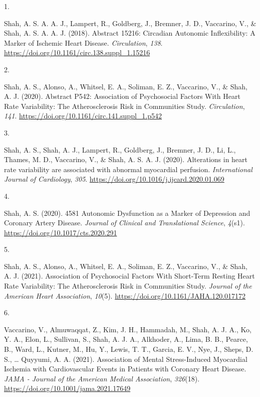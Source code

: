 \documentclass[10pt,a4paper,]{article}
\newlength{\cslhangindent}
\newlength{\csllabelwidth}
\newenvironment{CSLReferences}[2] %
 {\begin{list}{}{%
  \setlength{\itemindent}{0pt}
  \setlength{\leftmargin}{0pt}
  \setlength{\parsep}{0pt}
  \ifodd #1
   \setlength{\leftmargin}{\cslhangindent}
   \setlength{\itemindent}{-1\cslhangindent}
  \fi
  \setlength{\itemsep}{#2\baselineskip}}}
 {\end{list}}
\newcommand{\CSLLeftMargin}[1]{\parbox[t]{\csllabelwidth}{\strut#1\strut}}
\newcommand{\CSLRightInline}[1]{\parbox[t]{\linewidth - \csllabelwidth}{\strut#1\strut}}
\begin{document}
\hypertarget{refs-c6c7117c9609415cd3b5d6003cd86a32}{}
\begin{CSLReferences}{0}{0}
\leavevmode{}%
\CSLLeftMargin{1. }%
\CSLRightInline{Shah, A. S. A. A. J., Lampert, R., Goldberg, J.,
Bremner, J. D., Vaccarino, V., \& Shah, A. S. A. A. J. (2018). Abstract
15216: Circadian Autonomic Inflexibility: A Marker of Ischemic Heart
Disease. \emph{Circulation}, \emph{138}.
\url{https://doi.org/10.1161/circ.138.suppl_1.15216}}

\leavevmode{}%
\CSLLeftMargin{2. }%
\CSLRightInline{Shah, A. S., Alonso, A., Whitsel, E. A., Soliman, E. Z.,
Vaccarino, V., \& Shah, A. J. (2020). Abstract P542: Association of
Psychosocial Factors With Heart Rate Variability: The Atherosclerosis
Risk in Communities Study. \emph{Circulation}, \emph{141}.
\url{https://doi.org/10.1161/circ.141.suppl_1.p542}}

\leavevmode{}%
\CSLLeftMargin{3. }%
\CSLRightInline{Shah, A. S., Shah, A. J., Lampert, R., Goldberg, J.,
Bremner, J. D., Li, L., Thames, M. D., Vaccarino, V., \& Shah, A. S. A.
J. (2020). Alterations in heart rate variability are associated with
abnormal myocardial perfusion. \emph{International Journal of
Cardiology}, \emph{305}.
\url{https://doi.org/10.1016/j.ijcard.2020.01.069}}

\leavevmode{}%
\CSLLeftMargin{4. }%
\CSLRightInline{Shah, A. S. (2020). 4581 Autonomic Dysfunction as a
Marker of Depression and Coronary Artery Disease. \emph{Journal of
Clinical and Translational Science}, \emph{4}(s1).
\url{https://doi.org/10.1017/cts.2020.291}}

\leavevmode{}%
\CSLLeftMargin{5. }%
\CSLRightInline{Shah, A. S., Alonso, A., Whitsel, E. A., Soliman, E. Z.,
Vaccarino, V., \& Shah, A. J. (2021). Association of Psychosocial
Factors With Short‐Term Resting Heart Rate Variability: The
Atherosclerosis Risk in Communities Study. \emph{Journal of the American
Heart Association}, \emph{10}(5).
\url{https://doi.org/10.1161/JAHA.120.017172}}

\leavevmode{}%
\CSLLeftMargin{6. }%
\CSLRightInline{Vaccarino, V., Almuwaqqat, Z., Kim, J. H., Hammadah, M.,
Shah, A. J. A., Ko, Y. A., Elon, L., Sullivan, S., Shah, A. J. A.,
Alkhoder, A., Lima, B. B., Pearce, B., Ward, L., Kutner, M., Hu, Y.,
Lewis, T. T., Garcia, E. V., Nye, J., Sheps, D. S., \ldots{} Quyyumi, A.
A. (2021). Association of Mental Stress-Induced Myocardial Ischemia with
Cardiovascular Events in Patients with Coronary Heart Disease.
\emph{JAMA - Journal of the American Medical Association},
\emph{326}(18). \url{https://doi.org/10.1001/jama.2021.17649}}


\end{CSLReferences}
\end{document}

